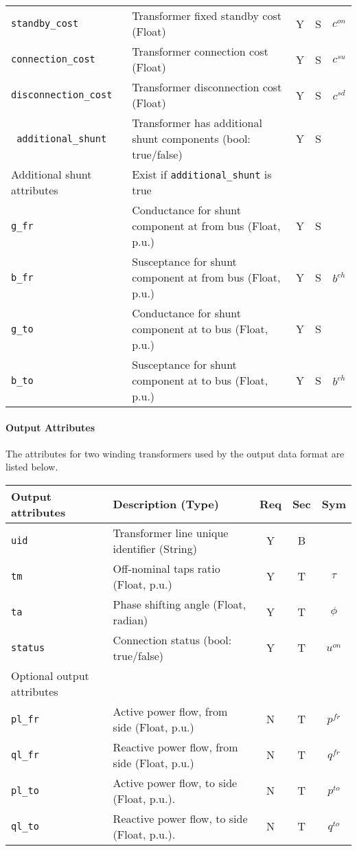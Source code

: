 \documentclass{article}
\begin{document}
\begin{center}
\begin{tabular}{ l | l | c | c | c |}
  {\tt standby\_cost} & Transformer fixed standby cost (Float) & Y & S & $c^{on}$\\
  {\tt connection\_cost} &  Transformer connection cost (Float) & Y & S & $c^{su}$\\      
  {\tt disconnection\_cost} & Transformer disconnection cost (Float) & Y & S & $c^{sd}$\\  
  {\tt\color{red} additional\_shunt} & Transformer has additional shunt components (bool: true/false)& Y & S & \\
  \hline    
  Additional shunt attributes & Exist if {\tt additional\_shunt} is true &  & & \\
  \hline
  {\tt g\_fr} & Conductance for shunt component at from bus (Float, p.u.)& Y & S & \\
  {\tt b\_fr} & Susceptance for shunt component at from bus (Float, p.u.)& Y & S & $b^{ch}$\\
  {\tt g\_to} & Conductance for shunt component at to bus (Float, p.u.)& Y & S & \\
  {\tt b\_to} & Susceptance for shunt component at to bus (Float, p.u.)& Y & S & $b^{ch}$\\
  \hline
\end{tabular}
\end{center}

\paragraph{Output Attributes}
The attributes for two winding transformers used by the output data format are listed below.
\begin{center}
\small
\begin{tabular}{ l | l | c | c | c |}
Output attributes & Description (Type)& Req & Sec & Sym\\
\hline
 {\tt uid} & Transformer line unique identifier (String)& Y & B & \\
 {\tt tm} & Off-nominal taps ratio (Float, p.u.)& Y & T & $\tau$\\
 {\tt ta} & Phase shifting angle (Float, radian)& Y & T & $\phi$\\
 {\tt status}     & Connection status (bool: true/false) & Y & T & $u^{on}$ \\ 
\hline
  Optional output attributes &   &  & & \\
\hline
 {\tt pl\_fr} & Active power flow, from side (Float, p.u.)  & N & T & $p^{fr}$ \\
 {\tt ql\_fr} & Reactive power flow, from side (Float, p.u.)& N & T & $q^{fr}$ \\
 {\tt pl\_to} & Active power flow, to side (Float, p.u.).   & N & T & $p^{to}$ \\
 {\tt ql\_to} & Reactive power flow, to side (Float, p.u.). & N & T & $q^{to}$ \\
\hline 
\end{tabular}
\end{center}
\end{document}
